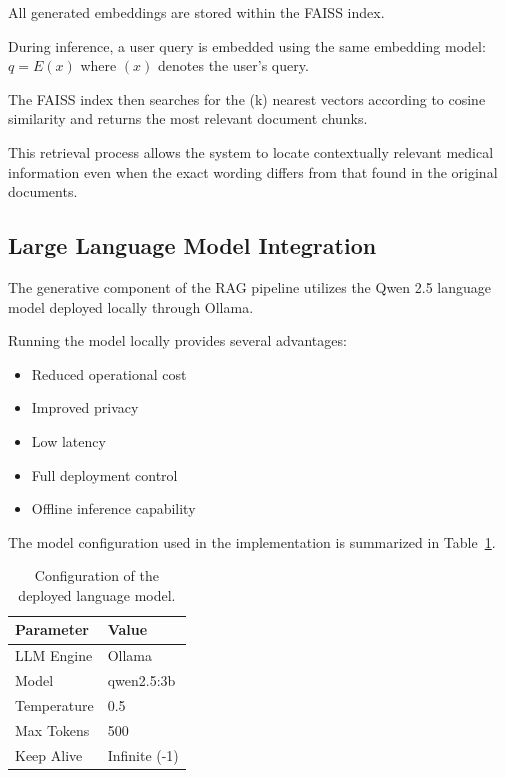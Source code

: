 All generated embeddings are stored within the FAISS index.

During inference, a user query is embedded using the same embedding model: $q = E(x)$ where $(x)$ denotes the user's query.

The FAISS index then searches for the (k) nearest vectors according to cosine similarity and returns the most relevant document chunks.

This retrieval process allows the system to locate contextually relevant medical information even when the exact wording differs from that found in the original documents.

\subsection{Large Language Model Integration}

The generative component of the RAG pipeline utilizes the Qwen 2.5 language model deployed locally through Ollama.

Running the model locally provides several advantages:

\begin{itemize}
	\item Reduced operational cost
	\item Improved privacy
	\item Low latency
	\item Full deployment control
	\item Offline inference capability
\end{itemize}

The model configuration used in the implementation is summarized in Table~\ref{tab:rag_model_configuration}.

\begin{table}[htbp]
	\centering
	\caption{Configuration of the deployed language model.}
	\label{tab:rag_model_configuration}
	\begin{tabular}{|l|l|}
		\hline
		\textbf{Parameter} & \textbf{Value} \\ 
		\hline
		LLM Engine & Ollama \\
		\hline
		Model & qwen2.5:3b \\
		\hline
		Temperature & 0.5 \\
		\hline
		Max Tokens & 500 \\
		\hline
		Keep Alive & Infinite (-1) \\
		\hline
	\end{tabular}
\end{table}

